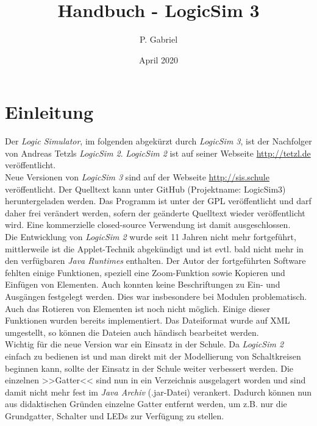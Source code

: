 \documentclass[12pt]{scrartcl}
\begin{document}
\newcommand{\lsN}{\textit{LogicSim 3}}
\newcommand{\lsA}{\textit{LogicSim 2}}
\newcommand{\bild}[2]{%
\begin{figure}[htb!]
\centering
\texttt{[image: abbildungen/\#1]}
\caption{#2}
\label{#1}
\end{figure}
}

\title{Handbuch - LogicSim 3}
\author{P. Gabriel}
\date{April 2020}
\vspace*{-11mm}

\section{Einleitung}
Der \textit{Logic Simulator}, im folgenden abgekürzt durch \lsN{}, ist der Nachfolger von Andreas Tetzls \lsA{}. \lsA{} ist auf seiner Webseite \url{http://tetzl.de} veröffentlicht.\\

Neue Versionen von \lsN{} sind auf der Webseite \url{http://sis.schule} veröffentlicht. Der Quelltext kann unter GitHub (Projektname: LogicSim3) heruntergeladen werden. Das Programm ist unter der GPL veröffentlicht und darf daher frei verändert werden, sofern der geänderte Quelltext wieder veröffentlicht wird. Eine kommerzielle closed-source Verwendung ist damit ausgeschlossen.\\

Die Entwicklung von \lsA{} wurde seit 11 Jahren nicht mehr fortgeführt, mittlerweile ist die Applet-Technik abgekündigt und ist evtl. bald nicht mehr in den verfügbaren \textit{Java Runtimes} enthalten. Der Autor der fortgeführten Software fehlten einige Funktionen, speziell eine Zoom-Funktion sowie Kopieren und Einfügen von Elementen. Auch konnten keine Beschriftungen zu Ein- und Ausgängen festgelegt werden. Dies war insbesondere bei Modulen problematisch. Auch das Rotieren von Elementen ist noch nicht möglich. Einige dieser Funktionen wurden bereits implementiert. Das Dateiformat wurde auf XML umgestellt, so können die Dateien auch händisch bearbeitet werden.\\

Wichtig für die neue Version war ein Einsatz in der Schule. Da \lsA{} einfach zu bedienen ist und man direkt mit der Modellierung von Schaltkreisen beginnen kann, sollte der Einsatz in der Schule weiter verbessert werden. Die einzelnen >>Gatter<< sind nun in ein Verzeichnis ausgelagert worden und sind damit nicht mehr fest im \textit{Java Archiv} (.jar-Datei) verankert. Dadurch können nun aus didaktischen Gründen einzelne Gatter entfernt werden, um z.B. nur die Grundgatter, Schalter und LEDs zur Verfügung zu stellen.\\
\end{document}
